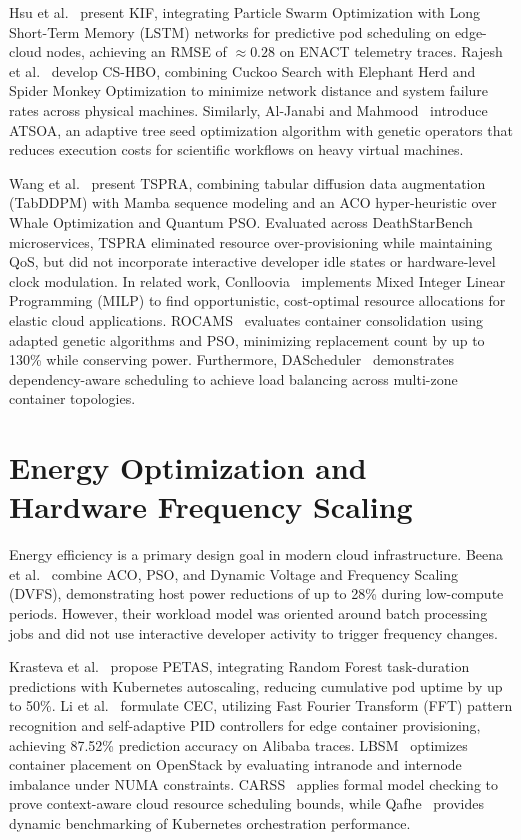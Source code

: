 \documentclass[12pt,a4paper]{report}
\begin{document}
	Hsu et al.~\cite{pso_lstm} present KIF, integrating Particle Swarm Optimization with Long Short-Term Memory (LSTM) networks for predictive pod scheduling on edge-cloud nodes, achieving an RMSE of $\approx 0.28$ on ENACT telemetry traces. Rajesh et al.~\cite{cshbo} develop CS-HBO, combining Cuckoo Search with Elephant Herd and Spider Monkey Optimization to minimize network distance and system failure rates across physical machines. Similarly, Al-Janabi and Mahmood~\cite{atsoa} introduce ATSOA, an adaptive tree seed optimization algorithm with genetic operators that reduces execution costs for scientific workflows on heavy virtual machines.
	
	Wang et al.~\cite{tspra} present TSPRA, combining tabular diffusion data augmentation (TabDDPM) with Mamba sequence modeling and an ACO hyper-heuristic over Whale Optimization and Quantum PSO. Evaluated across DeathStarBench microservices, TSPRA eliminated resource over-provisioning while maintaining QoS, but did not incorporate interactive developer idle states or hardware-level clock modulation. In related work, Conlloovia~\cite{conlloovia} implements Mixed Integer Linear Programming (MILP) to find opportunistic, cost-optimal resource allocations for elastic cloud applications. ROCAMS~\cite{rocams} evaluates container consolidation using adapted genetic algorithms and PSO, minimizing replacement count by up to 130\% while conserving power. Furthermore, DAScheduler~\cite{dascheduler} demonstrates dependency-aware scheduling to achieve load balancing across multi-zone container topologies.
	
	\section{Energy Optimization and Hardware Frequency Scaling}
	Energy efficiency is a primary design goal in modern cloud infrastructure. Beena et al.~\cite{dvfs} combine ACO, PSO, and Dynamic Voltage and Frequency Scaling (DVFS), demonstrating host power reductions of up to 28\% during low-compute periods. However, their workload model was oriented around batch processing jobs and did not use interactive developer activity to trigger frequency changes.
	
	Krasteva et al.~\cite{petas} propose PETAS, integrating Random Forest task-duration predictions with Kubernetes autoscaling, reducing cumulative pod uptime by up to 50\%. Li et al.~\cite{cec} formulate CEC, utilizing Fast Fourier Transform (FFT) pattern recognition and self-adaptive PID controllers for edge container provisioning, achieving 87.52\% prediction accuracy on Alibaba traces. LBSM~\cite{lbsm} optimizes container placement on OpenStack by evaluating intranode and internode imbalance under NUMA constraints. CARSS~\cite{carss} applies formal model checking to prove context-aware cloud resource scheduling bounds, while Qafhe~\cite{qafhe} provides dynamic benchmarking of Kubernetes orchestration performance.
	
\end{document}
